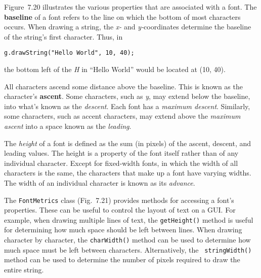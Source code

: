 Figure~7.20 illustrates the various properties that
are associated with a font.   The {\bf baseline} of a font refers to
the line on which the bottom of most characters occurs.  When drawing a
string, the {\it x-} and {\it y-}coordinates determine the baseline of
the string's first character.  Thus, in

\begin{jjjlisting}
\begin{lstlisting}
g.drawString("Hello World", 10, 40);
\end{lstlisting}
\end{jjjlisting}

\noindent the bottom left of the {\it H} in ``Hello World'' would be
located at (10, 40).

All characters ascend some distance above the baseline.  This is known
as the character's {\bf ascent}.  Some characters, such as {\it y},
may extend below the baseline, into what's known as the {\it
descent}. Each font has a {\it maximum descent}.  Similarly, some
characters, such as accent characters, may extend above the {\it
maximum ascent} into a space known as the {\it leading}.

The {\it height} of a font is defined as the sum (in pixels) of the
ascent, descent, and leading values.  The height is a property of the
font itself rather than of any individual character.   Except for
fixed-width fonts, in which the width of all characters is the same,
the characters that make up a font have varying widths.  The width of
an individual character is known as its {\it advance}.



The {\tt FontMetrics} class (Fig.~7.21) provides methods
for accessing a font's properties.  These can be useful to control the
layout of text on a GUI.  For example, when drawing multiple lines of
text, the {\tt getHeight()} method is useful for determining how much
space should be left between lines.  When drawing character by
character, the {\tt charWidth()} method can be used to determine how
much space must be left between characters.  Alternatively, the {\tt
stringWidth()} method can be used to determine the number of pixels
required to draw the entire string.

